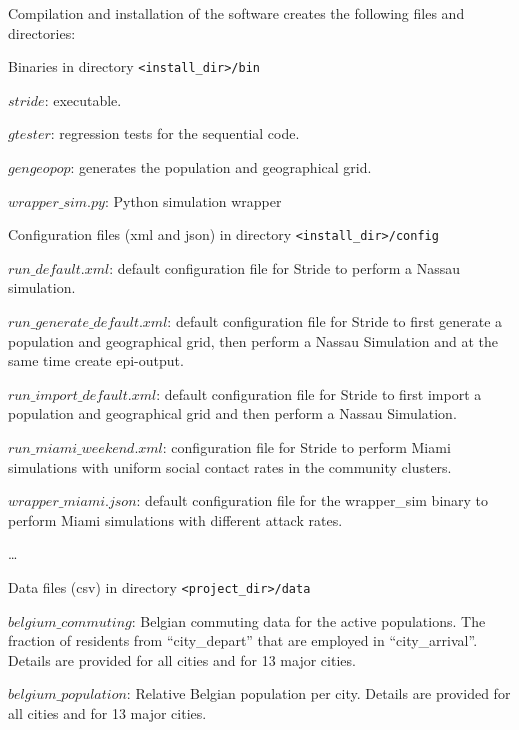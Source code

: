 Compilation and installation of the software creates the following files and directories:
\begin{compactitem}
%
	\item Binaries in directory \texttt{<install\_dir>/bin}
      		\begin{compactitem}
        			\item $stride$: executable.
        			\item $gtester$: regression tests for the sequential code.
               	 \item $gengeopop$: generates the population and geographical grid.
        			\item $wrapper\_sim.py$: Python simulation wrapper
        	\end{compactitem}
%
    \item Configuration files (xml and json) in directory \texttt{<install\_dir>/config}
      	\begin{compactitem}
			\item $run\_default.xml$: default configuration file for Stride to perform a Nassau simulation.
        		\item $run\_generate\_default.xml$: default configuration file for Stride to first generate a population and geographical grid, then perform a Nassau Simulation and at the same time create epi-output.
       		\item $run\_import\_default.xml$: default configuration file for Stride to first import a population and geographical grid and then perform a Nassau Simulation.
        		\item $run\_miami\_weekend.xml$: configuration file for Stride to perform Miami simulations with uniform social contact rates in the community clusters.
			\item $wrapper\_miami.json$: default configuration file for the wrapper\_sim binary to perform Miami simulations with different attack rates.
        		\item \ldots
        \end{compactitem}
%        
    \item Data files (csv) in directory \texttt{<project\_dir>/data}
      	\begin{compactitem}
        		\item $belgium\_commuting$: Belgian commuting data for the active populations. The fraction of residents from ``city\_depart'' that are employed in ``city\_arrival''. Details are provided for all cities and for 13 major cities.
			\item $belgium\_population$: Relative Belgian population per city. Details are provided for all cities and for 13 major cities.

\end{compactitem}
\end{compactitem}
